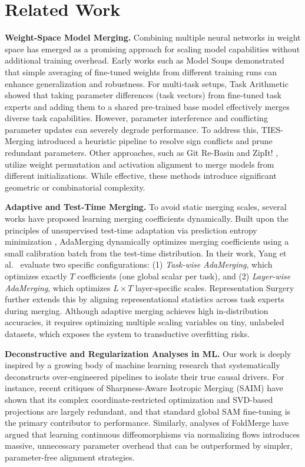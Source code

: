 \section{Related Work}
\label{submission:related_work}

\textbf{Weight-Space Model Merging.} Combining multiple neural networks in weight space has emerged as a promising approach for scaling model capabilities without additional training overhead. Early works such as Model Soups \cite{model_soups} demonstrated that simple averaging of fine-tuned weights from different training runs can enhance generalization and robustness. For multi-task setups, Task Arithmetic \cite{task_arithmetic} showed that taking parameter differences (task vectors) from fine-tuned task experts and adding them to a shared pre-trained base model effectively merges diverse task capabilities. However, parameter interference and conflicting parameter updates can severely degrade performance. To address this, TIES-Merging \cite{ties_merging} introduced a heuristic pipeline to resolve sign conflicts and prune redundant parameters. Other approaches, such as Git Re-Basin \cite{git_rebasin} and ZipIt! \cite{zipit}, utilize weight permutation and activation alignment to merge models from different initializations. While effective, these methods introduce significant geometric or combinatorial complexity.

\textbf{Adaptive and Test-Time Merging.} To avoid static merging scales, several works have proposed learning merging coefficients dynamically. Built upon the principles of unsupervised test-time adaptation via prediction entropy minimization \cite{tent}, AdaMerging \cite{AdaMerging_ICLR_2024} dynamically optimizes merging coefficients using a small calibration batch from the test-time distribution. In their work, Yang et al.\ \cite{AdaMerging_ICLR_2024} evaluate two specific configurations: (1) \emph{Task-wise AdaMerging}, which optimizes exactly $T$ coefficients (one global scalar per task), and (2) \emph{Layer-wise AdaMerging}, which optimizes $L \times T$ layer-specific scales. Representation Surgery \cite{representation_surgery} further extends this by aligning representational statistics across task experts during merging. Although adaptive merging achieves high in-distribution accuracies, it requires optimizing multiple scaling variables on tiny, unlabeled datasets, which exposes the system to transductive overfitting risks.

\textbf{Deconstructive and Regularization Analyses in ML.} Our work is deeply inspired by a growing body of machine learning research that systematically deconstructs over-engineered pipelines to isolate their true causal drivers. For instance, recent critiques of Sharpness-Aware Isotropic Merging (SAIM) \cite{saim_deconstruction} have shown that its complex coordinate-restricted optimization and SVD-based projections are largely redundant, and that standard global SAM fine-tuning is the primary contributor to performance. Similarly, analyses of FoldMerge \cite{convoluted_origami} have argued that learning continuous diffeomorphisms via normalizing flows introduces massive, unnecessary parameter overhead that can be outperformed by simpler, parameter-free alignment strategies. 

